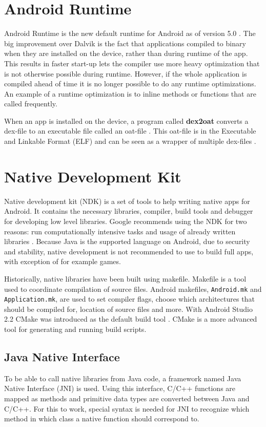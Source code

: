 \section{Android Runtime}
Android Runtime is the new default runtime for Android as of version 5.0 \cite{android:dalvik}. The big improvement over Dalvik is the fact that applications compiled to binary when they are installed on the device, rather than during runtime of the app. This results in faster start-up \cite{li2016advanced} lets the compiler use more heavy optimization that is not otherwise possible during runtime. However, if the whole application is compiled ahead of time it is no longer possible to do any runtime optimizations. An example of a runtime optimization is to inline methods or functions that are called frequently.

When an app is installed on the device, a program called \textbf{dex2oat} converts a dex-file to an executable file called an oat-file \cite{android:art:dalvik}. This oat-file is in the Executable and Linkable Format (ELF) and can be seen as a wrapper of multiple dex-files \cite{Dresel2016}.


\section{Native Development Kit}
Native development kit (NDK) is a set of tools to help writing native apps for Android. It contains the necessary libraries, compiler, build tools and debugger for developing low level libraries. Google recommends using the NDK for two reasons: run computationally intensive tasks and usage of already written libraries \cite{android:ndk:guides}. Because Java is the supported language on Android, due to security and stability, native development is not recommended to use to build full apps, with exception of for example games.

Historically, native libraries have been built using makefile. Makefile is a tool used to coordinate compilation of source files. Android makefiles, \texttt{Android.mk} and \texttt{Application.mk}, are used to set compiler flags, choose which architectures that should be compiled for, location of source files and more. With Android Studio 2.2 CMake was introduced as the default build tool \cite{android:studio:cmake}. CMake is a more advanced tool for generating and running build scripts.

\subsection{Java Native Interface}
To be able to call native libraries from Java code, a framework named Java Native Interface (JNI) is used. Using this interface, C/C++ functions are mapped as methods and primitive data types are converted between Java and C/C++. For this to work, special syntax is needed for JNI to recognize which method in which class a native function should correspond to.

